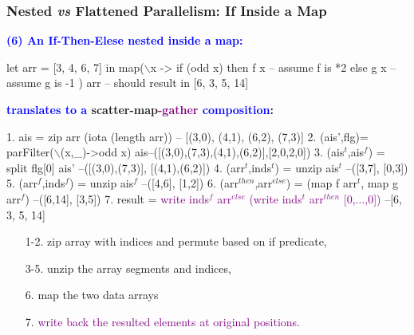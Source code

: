 \documentclass{beamer}
\newcommand{\blue}[1]{\textcolor{Blue}{{#1}}}
\newcommand{\purple}[1]{\textcolor{Purple}{{#1}}}
\renewcommand{\emph}[1]{\textcolor{structure}{#1}}
\newcommand{\emp}[1]{\textcolor{DikuRed}{ #1}}
\newcommand{\mymath}[1]{$ #1 $}
\newcommand{\myindu}[1]{^{#1}}
\begin{document}
\begin{frame}[fragile,t]
  \frametitle{Nested {\it vs} Flattened Parallelism: If Inside a Map}

\blue{\bf (6) An If-Then-Elese nested inside a map:} 

\begin{colorcode}[fontsize=\scriptsize]
let arr = [3, 4, 6, 7] in
map(\mymath{\backslash}x -> if (odd x)  then f x  -- assume f is *2
                      else g x  -- assume g is -1 ) arr 
-- should result in [6, 3, 5, 14]
\end{colorcode}

\bigskip
\pause

\textbf{\blue{translates to a} \emp{scatter-}\emph{map}\purple{-gather} \blue{composition}:}
\bigskip

\begin{colorcode}[fontsize=\scriptsize]
1. ais = zip arr (iota (length arr))      -- [(3,0), (4,1), (6,2), (7,3)]
2. (ais',flg)=\emp{parFilter}(\mymath{\backslash}(x,_)->odd x) ais--([(3,0),(7,3),(4,1),(6,2)],[2,0,2,0])
3. (ais\mymath{\myindu{t}},ais\mymath{\myindu{f}}) = split flg[0] ais'        --([(3,0),(7,3)], [(4,1),(6,2)])
4. (arr\mymath{\myindu{t}},inds\mymath{\myindu{t}}) = unzip ais\mymath{\myindu{t}}                 --([3,7], [0,3])
5. (arr\mymath{\myindu{f}},inds\mymath{\myindu{f}}) = unzip ais\mymath{\myindu{f}}                 --([4,6], [1,2])
6. (arr\mymath{\myindu{then}},arr\mymath{\myindu{else}}) = (\emph{map f arr\mymath{\myindu{t}}, map g arr\mymath{\myindu{f}}}) --([6,14], [3,5])
7. result = \purple{write inds\mymath{\myindu{f}} arr\mymath{\myindu{else}} (write inds\mymath{\myindu{t}} arr\mymath{\myindu{then}} [0,\mymath{\ldots},0])} --[6, 3, 5, 14]
\end{colorcode}

\bigskip

\begin{itemize}
    \item[1-2.] zip array with indices and \emp{permute based on if predicate},
    \item[3-5.] unzip the array segments and indices,
    \item[6.] \emph{map the two data arrays}
    \item[7.] \purple{write back the resulted elements at original positions.}
\end{itemize}

\end{frame}
\end{document}
